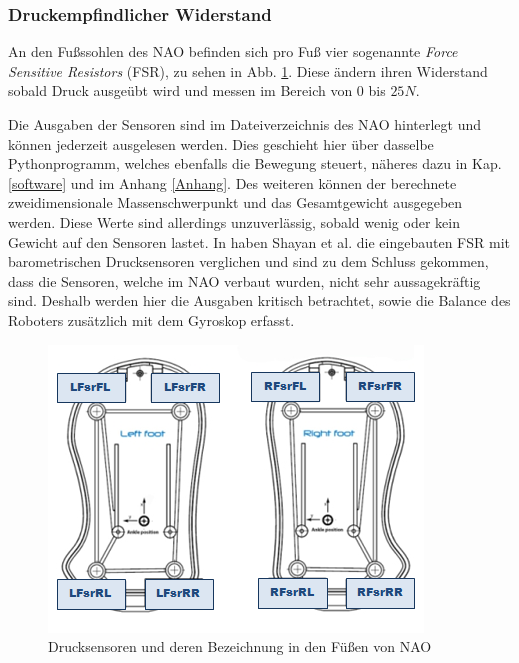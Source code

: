 \subsubsection*{Druckempfindlicher Widerstand}

An den Fußssohlen des NAO befinden sich pro Fuß vier sogenannte \textit{Force Sensitive Resistors} (FSR), zu sehen in Abb. \ref{hardware_semelles}. Diese ändern ihren Widerstand sobald Druck ausgeübt wird und messen im Bereich von 0 bis $25 \unit{N}$.

Die Ausgaben der Sensoren sind im Dateiverzeichnis des NAO hinterlegt und können jederzeit ausgelesen werden. Dies geschieht hier über dasselbe Pythonprogramm, welches ebenfalls die Bewegung steuert, näheres dazu in Kap. \ref{software} und im Anhang \ref{Anhang}.
Des weiteren können der berechnete zweidimensionale Massenschwerpunkt und das Gesamtgewicht ausgegeben werden. Diese Werte sind allerdings unzuverlässig, sobald wenig oder kein Gewicht auf den Sensoren lastet. In \cite{pressure_shoe} haben Shayan et al. die eingebauten FSR mit barometrischen Drucksensoren verglichen und sind zu dem Schluss gekommen, dass die Sensoren, welche im NAO verbaut wurden, nicht sehr aussagekräftig sind. Deshalb werden hier die Ausgaben kritisch betrachtet, sowie die Balance des Roboters zusätzlich mit dem Gyroskop erfasst.
\begin{figure}[tb]
	\centering
	\includegraphics[width=0.6\linewidth]{Bilder/hardware_semelles.png}
	\caption{Drucksensoren und deren Bezeichnung in den Füßen von NAO \cite[ in /Technical overview/FSRs]{nao_docu_dev_guide}
	}
	\label{hardware_semelles}
\end{figure}

